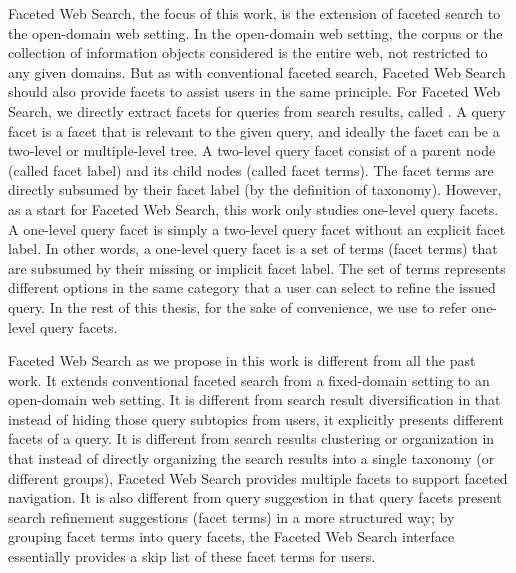 Faceted Web Search, the focus of this work, is the extension of faceted search to the open-domain web setting. In the open-domain web setting, the corpus or the collection of information objects considered is the entire web, not restricted to any given domains. But as with conventional faceted search, Faceted Web Search should also provide facets to assist users in the same principle. For Faceted Web Search, we directly extract facets for queries from search results, called . A query facet is a facet that is relevant to the given query, and ideally the facet can be a two-level or multiple-level tree. A two-level query facet consist of a parent node (called facet label) and its child nodes (called facet terms). The facet terms are directly subsumed by their facet label (by the definition of taxonomy). However, as a start for Faceted Web Search, this work only studies one-level query facets. A one-level query facet is simply a two-level query facet without an explicit facet label. In other words, a one-level query facet is a set of terms (facet terms) that are subsumed by their missing or implicit facet label. The set of terms represents different options in the same category that a user can select to refine the issued query. In the rest of this thesis, for the sake of convenience, we use  to refer one-level query facets.

Faceted Web Search as we propose in this work is different from all the past work. It extends conventional faceted search from a fixed-domain setting to an open-domain web setting. It is different from search result diversification in that instead of hiding those query subtopics from users, it explicitly presents different facets of a query. It is different from search results clustering or organization in that instead of directly organizing the search results into a single taxonomy (or different groups), Faceted Web Search provides multiple facets to support faceted navigation. It is also different from query suggestion in that query facets present search refinement suggestions (facet terms) in a more structured way; by grouping facet terms into query facets, the Faceted Web Search interface essentially provides a skip list of these facet terms for users.

